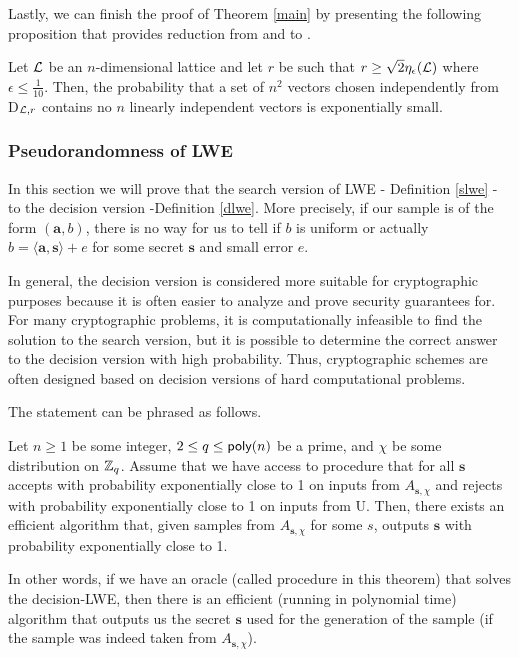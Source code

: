 Lastly, we can finish the proof of Theorem \ref{main} by presenting the following proposition that provides reduction from  and  to .

\begin{proposition}
	Let $\mathcal{L}$ be an $n$-dimensional lattice and let $r$ be such that $r \geq \sqrt{2}\eta_{\epsilon}(\mathcal{L})$ where $\epsilon \leq \frac{1}{10}$. Then, the probability that a set of $n^2$ vectors chosen independently from D$_{\mathcal{L},r}$ contains no $n$ linearly independent vectors is exponentially small.
\end{proposition}

\subsubsection{Pseudorandomness of LWE}
In this section we will prove that the search version of LWE - Definition \ref{slwe} - to the decision version -Definition \ref{dlwe}. More precisely, if our sample is of the form $(\bm{a}, b)$, there is no way for us to tell if $b$ is uniform or actually $b = \langle \bm{a}, \bm{s} \rangle + e$ for some secret $\bm{s}$ and small error $e$.

In general, the decision version is considered more suitable for cryptographic purposes because it is often easier to analyze and prove security guarantees for. For many cryptographic problems, it is computationally infeasible to find the solution to the search version, but it is possible to determine the correct answer to the decision version with high probability. Thus, cryptographic schemes are often designed based on decision versions of hard computational problems.

The statement can be phrased as follows.
\begin{theorem}\label{s-to-d}
	Let $n \geq 1$ be some integer, $2 \leq q\leq \alg{poly}(n)$ be a prime, and $\chi$ be some distribution on $\mathbb{Z}_q$. Assume that we have access to procedure  that for all $\bm{s}$ accepts with probability exponentially close to 1 on inputs from $A_{\bm{s},\chi}$ and rejects with probability exponentially close to 1 on inputs from U. Then, there exists an efficient algorithm  that, given samples from $A_{\bm{s},\chi}$ for some $s$, outputs $\bm{s}$ with probability exponentially close to 1.
\end{theorem}

In other words, if we have an oracle (called procedure in this theorem) that solves the decision-LWE, then there is an efficient (running in polynomial time) algorithm that outputs us the secret $\bm{s}$ used for the generation of the sample (if the sample was indeed taken from $A_{\bm{s}, \chi}$).

